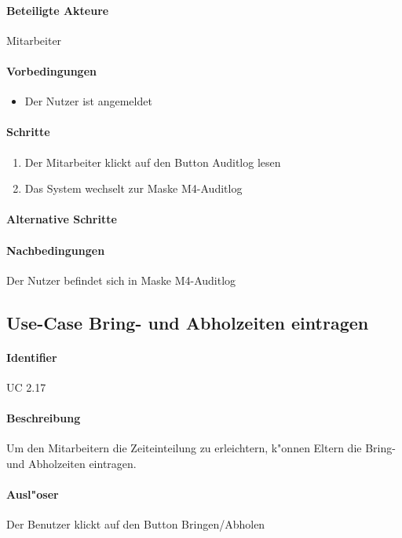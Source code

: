   \paragraph{Beteiligte Akteure}   \leavevmode \newline
    Mitarbeiter
  \paragraph{Vorbedingungen}
  \begin{itemize}
   \item Der Nutzer ist angemeldet
  \end{itemize}

  \paragraph{Schritte}
  \begin{enumerate}
   \item Der Mitarbeiter klickt auf den Button \dq Auditlog lesen\dq
   \item Das System wechselt zur Maske M4-Auditlog
  \end{enumerate}
  \paragraph{Alternative Schritte}
  \paragraph{Nachbedingungen}
  Der Nutzer befindet sich in Maske M4-Auditlog

  
  \newpage
 \subsection{Use-Case Bring- und Abholzeiten eintragen}
  \paragraph{Identifier}
  UC 2.17
  \paragraph{Beschreibung}
  Um den Mitarbeitern die Zeiteinteilung zu erleichtern, k"onnen Eltern die Bring- und Abholzeiten eintragen.
  \paragraph{Ausl"oser}
  Der Benutzer klickt auf den Button \dq Bringen/Abholen\dq
